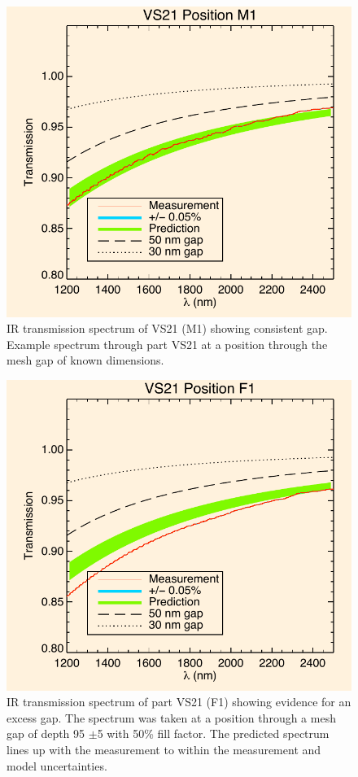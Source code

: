 \documentclass[osajnl,preprint,showpacs,superscriptaddress,12pt]{revtex4-1} %
\begin{document}
\begin{figure}[htbp]
\centerline{\includegraphics[width=.8\columnwidth]{figs/20130911_VS21posM1.pdf}}
\caption{IR transmission spectrum of VS21 (M1) showing consistent gap\label{VS21specm1}.  Example spectrum through part VS21 at a position through the mesh gap of known dimensions.}
\end{figure}

\begin{figure}[htbp]
\centerline{\includegraphics[width=.8\columnwidth]{figs/20130911_VS21posF1}}
\caption{IR transmission spectrum of part VS21 (F1) showing evidence for an excess gap\label{VS21specf1}.  The spectrum was taken at a position through a mesh gap of depth 95 $\pm$5 with 50\% fill factor.  The predicted spectrum lines up with the measurement to within the measurement and model uncertainties.}
\end{figure}
\end{document}
